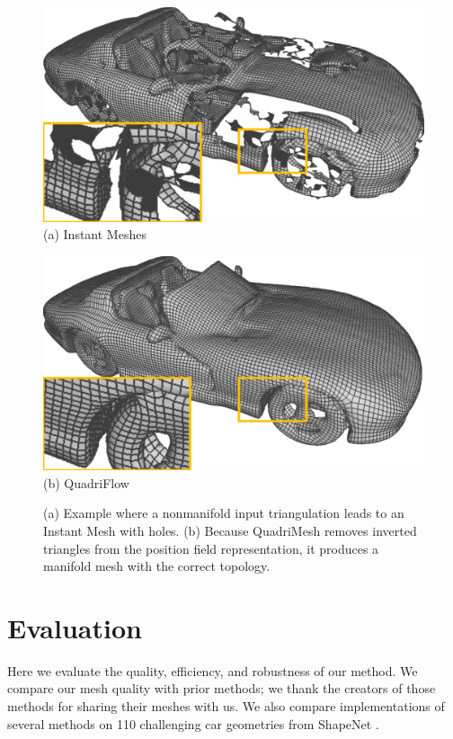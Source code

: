 \begin{figure}
\centering
\begin{minipage}{0.49\linewidth}
\centering
\includegraphics[width=\linewidth]{quadriflow/result/mesh01.pdf}\\
(a) Instant Meshes
\end{minipage}
\begin{minipage}{0.49\linewidth}
\centering
\includegraphics[width=\linewidth]{quadriflow/result/mesh00.pdf}\\
(b) QuadriFlow
\end{minipage}

\caption{(a) Example where a nonmanifold input triangulation leads to an Instant Mesh with holes. (b) Because QuadriMesh removes inverted triangles from the position field representation, it produces a manifold mesh with the correct topology.}
\label{fig:quad-fail-face}
\end{figure}


\section{Evaluation}
\label{sec:quad-evaluate}
Here we evaluate the quality, efficiency, and robustness of our method. We compare our mesh quality with prior methods; we thank the creators of those methods for sharing their meshes with us. We also compare implementations of several methods on 110 challenging car geometries from ShapeNet \cite{chang2015shapenet,huang2018robust}.

